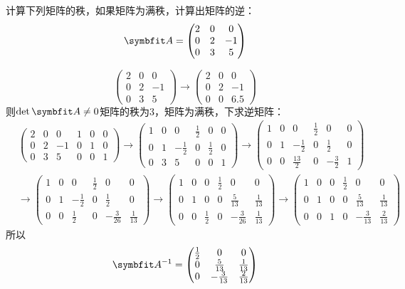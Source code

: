 \begin{example}{}{}
    计算下列矩阵的秩，如果矩阵为满秩，计算出矩阵的逆：\[\bv{A}=\begin{pmatrix}2&0&0\\0&2&-1\\0&3&5\end{pmatrix}\]
\end{example}
\begin{solution}
    \[\begin{pmatrix}2&0&0\\0&2&-1\\0&3&5\end{pmatrix}\rightarrow \begin{pmatrix}2&0&0\\0&2&-1\\0&0&6.5\end{pmatrix}\]
    则$\det{\bv{A}}\ne 0$矩阵的秩为3，矩阵为满秩，下求逆矩阵：
    \begin{align*}
        &\begin{pmatrix}2&0&0&1&0&0\\0&2&-1&0&1&0\\0&3&5&0&0&1\end{pmatrix}\rightarrow \begin{pmatrix}1&0&0&\frac{1}{2}&0&0\\0&1&-\frac{1}{2}&0&\frac{1}{2}&0\\0&3&5&0&0&1\end{pmatrix}\rightarrow \begin{pmatrix}1&0&0&\frac{1}{2}&0&0\\0&1&-\frac{1}{2}&0&\frac{1}{2}&0\\0&0&\frac{13}{2}&0&-\frac{3}{2}&1\end{pmatrix}\\&\rightarrow  \begin{pmatrix}1&0&0&\frac{1}{2}&0&0\\0&1&-\frac{1}{2}&0&\frac{1}{2}&0\\0&0&\frac{1}{2}&0&-\frac{3}{26}&\frac{1}{13}\end{pmatrix}\rightarrow \begin{pmatrix}1&0&0&\frac{1}{2}&0&0\\0&1&0&0&\frac{5}{13}&\frac{1}{13}\\0&0&\frac{1}{2}&0&-\frac{3}{26}&\frac{1}{13}\end{pmatrix}\rightarrow \begin{pmatrix}1&0&0&\frac{1}{2}&0&0\\0&1&0&0&\frac{5}{13}&\frac{1}{13}\\0&0&1&0&-\frac{3}{13}&\frac{2}{13}\end{pmatrix}\
    \end{align*}
所以\[\bv{A}^{-1}=\begin{pmatrix}
    \frac{1}{2}&0&0\\0&\frac{5}{13}&\frac{1}{13}\\0&-\frac{3}{13}&\frac{2}{13}
\end{pmatrix}\]
\end{solution}

